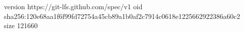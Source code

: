 version https://git-lfs.github.com/spec/v1
oid sha256:120e68aa1f6f99fd72754a45cb89a1b0af2c7914c0618e1225662922386a60c2
size 121660
